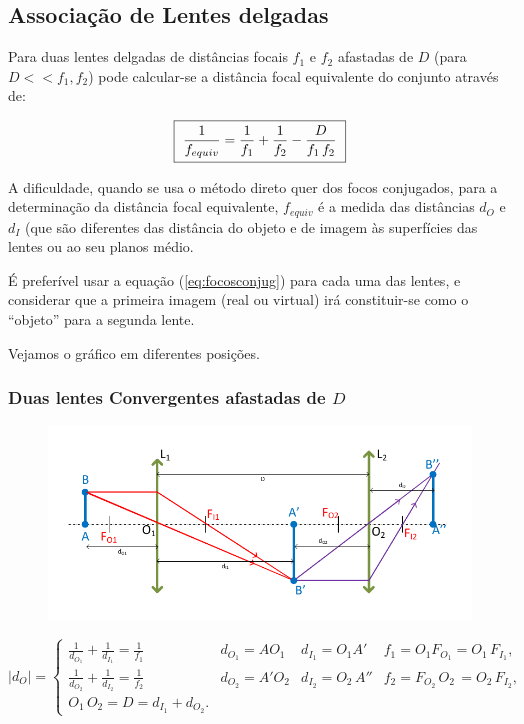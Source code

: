 \documentclass[a4paper,12pt]{article}      %
\begin{document}
\subsection{\sf Associação de Lentes delgadas}

Para duas lentes delgadas de distâncias focais $f_1$ e $f_2$ afastadas de $D$ (para $D << f_1,f_2$) pode calcular-se a distância focal equivalente do conjunto através de: 

 \begin{equation}
	\label{eq:assoclentes}
    \fbox{
        $ \displaystyle
	\frac{1}{f_{equiv}} = \frac{1}{f_1} + \frac{1}{f_2} - \frac{D}{f_1 \,f_2} 
        $
    }
\end{equation}

A dificuldade, quando se usa o método direto quer dos focos conjugados, para a determinação da distância focal equivalente, ${f_{equiv}}$ é a medida das distâncias $d_O$ e $d_I$ 
(que são diferentes das distância do objeto e de imagem às superfícies das lentes ou ao seu planos médio.

É preferível usar a equação (\ref{eq:focosconjug}) para cada uma das lentes, e considerar que a primeira imagem (real ou virtual) irá constituir-se como o “objeto”  para a segunda lente. 

Vejamos o gráfico em diferentes posições.

\subsubsection{\sf Duas lentes Convergentes afastadas de $D$}
\begin{figure}	[!htb]  \centering 
	\includegraphics[width=\textwidth]{duplaConver_I}
\end{figure}

\begin{equation}
|d_O|  =  \left\{
\begin{array}{llll}
 \frac{1}{d_{O_1}} +  \frac{1}{d_{I_1}}   = \frac{1}{f_1}  & d_{O_1} = AO_1 & d_{I_1} = O_1A' & f_1 = O_1 F_{O_1} = O_1\,F_{I_1} ,\\
 \frac{1}{d_{O_2}} +  \frac{1}{d_{I_2}}   = \frac{1}{f_2}  & d_{O_2} = A'O_2 & d_{I_2} = O_2\,A'' & f_2 =  F_{O_2}\,O_2\, = O_2\,F_{I_2}, \\
O_1\,O_2 = D = d_{I_1} + d_{O_2}.
\end{array}  \right.
\label{eq:assoclentes_2}
\end{equation}
\end{document}
